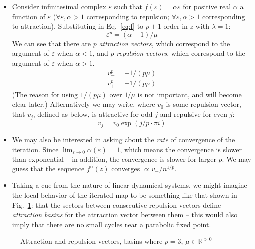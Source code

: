 \documentclass{article}
\begin{document}
\begin{itemize}
    \item Consider infinitesimal complex $\varepsilon$ such that $f(\varepsilon)=\alpha\varepsilon$ for positive real $\alpha$ a function of $\varepsilon$ ($\forall \varepsilon, \alpha > 1$ corresponding to repulsion; $\forall \varepsilon, \alpha > 1$ corresponding to attraction). Substituting in Eq.~\ref{eq:f} to $p+1$ order in $z$ with $\lambda=1$:
    \begin{equation*}
        {\varepsilon^p} = (\alpha  - 1)/\mu 
    \end{equation*} 
    We can see that there are $p$ \textit{attraction vectors}, which correspond to the argument of $\varepsilon$ when $\alpha < 1$, and $p$ \textit{repulsion vectors}, which correspond to the argument of $\varepsilon$ when $\alpha > 1$. 
    \begin{equation*}
        \begin{array}{*{20}{c}}
            {v_ - ^p =  - 1/(p \mu) } \\
            {v_ + ^p =  + 1/(p \mu) }
        \end{array}    
    \end{equation*}
    (The reason for using $1/(p \mu)$ over $1/\mu$ is not important, and will become clear later.)
    Alternatively we may write, where $v_0$ is some repulsion vector, that $v_j$, defined as below, is attractive for odd $j$ and repulsive for even $j$: 
    \begin{equation}
        \label{eq:v}
        v_j = v_0 \exp\left(j/ p \cdot \pi i\right)
    \end{equation}
    \item We may also be interested in asking about the \textit{rate} of convergence of the iteration. Since $\lim_{\varepsilon\to 0}\alpha(\varepsilon) = 1$, which means the convergence is slower than exponential -- in addition, the convergence is slower for larger $p$. We may guess that the sequence $f^n(z)$ converges $\propto v_-/n^{1/p}$.
    \item Taking a cue from the nature of linear dynamical systems, we might imagine the local behavior of the iterated map to be something like that shown in Fig.~\ref{fig:basins}: that the sectors between consecutive repulsion vectors define \textit{attraction basins} for the attraction vector between them -- this would also imply that there are no small cycles near a parabolic fixed point.
\end{itemize}

\begin{figure}
    \label{fig:basins}
    \centering
    
    \caption{Attraction and repulsion vectors, basins where $p = 3$, $\mu\in\mathbb{R}^{> 0}$}
\end{figure}
\end{document}
